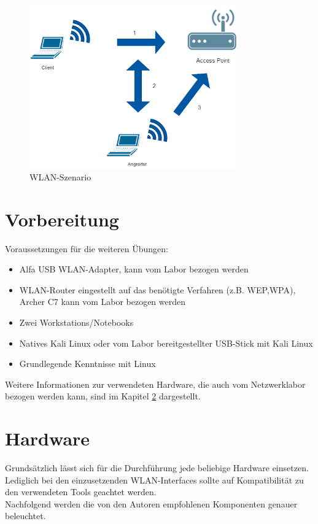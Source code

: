 \begin{figure}[H]
	\centering
	\includegraphics[width=0.8\textwidth]{images/WLAN/WLANSzenario.png}
	\caption{WLAN-Szenario}
	\label{fig:WLAN-Szenario}
\end{figure}

\section{Vorbereitung}

Voraussetzungen für die weiteren Übungen:

\begin{itemize}
	\item Alfa USB WLAN-Adapter, kann vom Labor bezogen werden
	\item WLAN-Router eingestellt auf das benötigte Verfahren (z.B. WEP,WPA), Archer C7 kann vom Labor bezogen werden
	\item Zwei Workstations/Notebooks
	\item Natives Kali Linux oder vom Labor bereitgestellter USB-Stick mit Kali Linux
	\item Grundlegende Kenntnisse mit Linux
\end{itemize}
Weitere Informationen zur verwendeten Hardware, die auch vom Netzwerklabor bezogen werden kann, sind im Kapitel \ref{hw}  dargestellt. 

\section{Hardware}\label{hw}
Grundsätzlich lässt sich für die Durchführung jede beliebige Hardware einsetzen. Lediglich bei den einzusetzenden WLAN-Interfaces sollte auf Kompatibilität zu den verwendeten Tools geachtet werden.\\
Nachfolgend werden die von den Autoren empfohlenen Komponenten genauer beleuchtet. 
 
